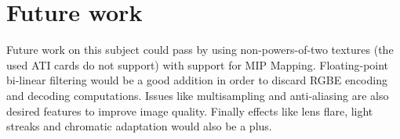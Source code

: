 \documentclass[twocolumn,8pt]{article}
\begin{document}
\section{Future work}
Future work on this subject could pass by using non-powers-of-two textures (the used ATI cards do not support) with support for MIP Mapping. Floating-point bi-linear filtering would be a good addition in order to discard RGBE encoding and decoding computations. Issues like multisampling and anti-aliasing are also desired features to improve image quality. Finally effects like lens flare, light streaks and chromatic adaptation would also be a plus.

\begin{figure}[tb]
\centering
{} 

\end{figure}
\end{document}

